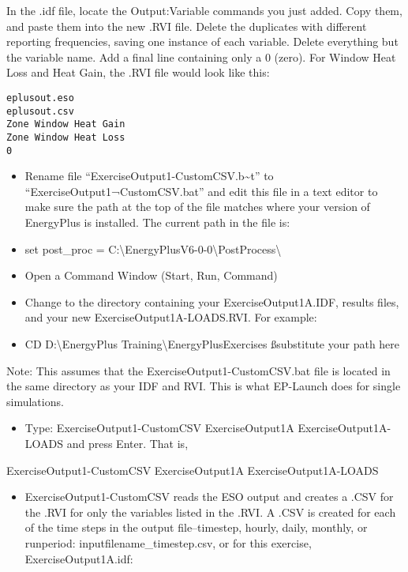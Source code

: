 In the .idf file, locate the Output:Variable commands you just added. Copy them, and paste them into the new .RVI file. Delete the duplicates with different reporting frequencies, saving one instance of each variable. Delete everything but the variable name. Add a final line containing only a 0 (zero). For Window Heat Loss and Heat Gain, the .RVI file would look like this:

\begin{lstlisting}
eplusout.eso
eplusout.csv
Zone Window Heat Gain
Zone Window Heat Loss
0
\end{lstlisting}

\begin{itemize}
\item
  Rename file ``ExerciseOutput1-CustomCSV.b\textasciitilde{}t'' to ``ExerciseOutput1¬CustomCSV.bat'' and edit this file in a text editor to make sure the path at the top of the file matches where your version of EnergyPlus is installed. The current path in the file is:
\item
  set post\_proc = C:\textbackslash{}EnergyPlusV6-0-0\textbackslash{}PostProcess\textbackslash{}
\item
  Open a Command Window (Start, Run, Command)
\item
  Change to the directory containing your ExerciseOutput1A.IDF, results files, and your new ExerciseOutput1A-LOADS.RVI. For example:
\item
  CD D:\textbackslash{}EnergyPlus Training\textbackslash{}EnergyPlusExercises ßsubstitute your path here
\end{itemize}

Note: This assumes that the ExerciseOutput1-CustomCSV.bat file is located in the same directory as your IDF and RVI. This is what EP-Launch does for single simulations.

\begin{itemize}
\tightlist
\item
  Type: ExerciseOutput1-CustomCSV ExerciseOutput1A ExerciseOutput1A-LOADS and press Enter. That is,
\end{itemize}

ExerciseOutput1-CustomCSV ExerciseOutput1A ExerciseOutput1A-LOADS

\begin{itemize}
\tightlist
\item
  ExerciseOutput1-CustomCSV reads the ESO output and creates a .CSV for the .RVI for only the variables listed in the .RVI. A .CSV is created for each of the time steps in the output file--timestep, hourly, daily, monthly, or runperiod: inputfilename\_timestep.csv, or for this exercise, ExerciseOutput1A.idf:
\end{itemize}

